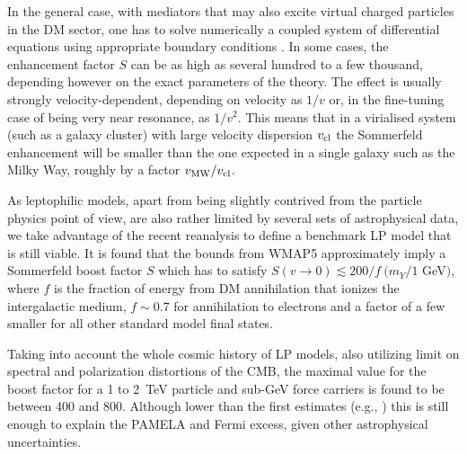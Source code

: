 \documentclass[10pt,aps,pra,reprint,amsmath,amsfonts,amssymb,showpacs,nofootinbib,floatfix]{revtex4-1}
\begin{document}
In the general case, with mediators that may also excite virtual
charged particles in the DM sector, one has to solve numerically a
coupled system of differential equations using appropriate boundary
conditions
\cite{2005PhRvD..71f3528H,2007NuPhB.787..152C,2009PhRvD..79a5014A}. In
some cases, the enhancement factor $S$ can be as high as several
hundred to a few thousand, depending however on the exact parameters
of the theory. The effect is usually strongly velocity-dependent,
depending on velocity as $1/v$ or, in the fine-tuning case of being
very near resonance, as $1/v^2$. This means that in a virialised
system (such as a galaxy cluster) with large velocity dispersion
$v_{\rm cl}$ the Sommerfeld enhancement will be smaller than the one
expected in a single galaxy such as the Milky Way, roughly by a factor
$v_{\rm MW}/v_{\rm cl}$.


As leptophilic models, apart from being slightly contrived from the
particle physics point of view, are also rather limited by several
sets of astrophysical data, we take advantage of the recent reanalysis
\cite{Finkbeiner:2010sm} to define a benchmark LP model that
is still viable.  It is found that the bounds from WMAP5 approximately
imply a Sommerfeld boost factor $S$ which has to satisfy $S(v\to
0)\lesssim 200/f\ (m_Y/1$ GeV$)$, where $f$ is the fraction of energy
from DM annihilation that ionizes the intergalactic medium,
$f\sim 0.7$ for annihilation to electrons and a factor of a few smaller
for all other standard model final states.

Taking into account the whole cosmic history of LP models, also
utilizing limit on spectral and polarization distortions of the CMB,
the maximal value for the boost factor for a 1 to 2~TeV particle and
sub-GeV force carriers is found to be \cite{Finkbeiner:2010sm} between
400 and 800. Although lower than the first estimates (e.g.,
\cite{Bergstrom:2009fa,Meade:2009iu}) this is still enough to explain
the PAMELA and Fermi excess, given other astrophysical uncertainties.
\end{document}
